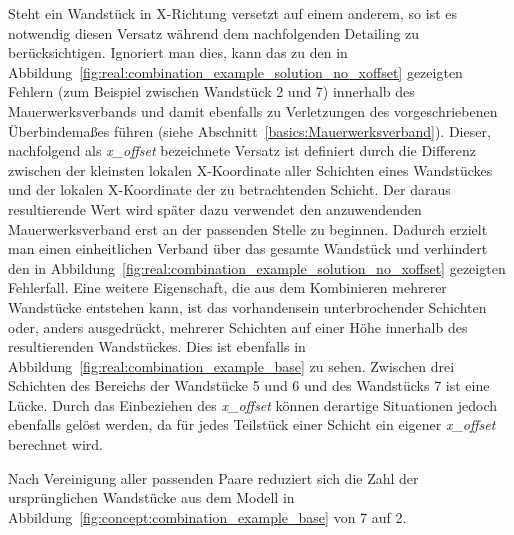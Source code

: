 Steht ein Wandstück in X-Richtung versetzt auf einem anderem, so ist es notwendig diesen Versatz während dem nachfolgenden Detailing zu berücksichtigen.
Ignoriert man dies, kann das zu den in Abbildung~\ref{fig:real:combination_example_solution_no_xoffset} gezeigten Fehlern (zum Beispiel zwischen Wandstück 2 und 7) innerhalb des Mauerwerksverbands und damit ebenfalls zu Verletzungen des vorgeschriebenen Überbindemaßes führen (siehe Abschnitt~\ref*{basics:Mauerwerksverband}).
Dieser, nachfolgend als \textit{x\_offset} bezeichnete Versatz ist definiert durch die Differenz zwischen der kleinsten lokalen X-Koordinate aller Schichten eines Wandstückes und der lokalen X-Koordinate der zu betrachtenden Schicht.
Der daraus resultierende Wert wird später dazu verwendet den anzuwendenden Mauerwerksverband erst an der passenden Stelle zu beginnen.
Dadurch erzielt man einen einheitlichen Verband über das gesamte Wandstück und verhindert den in Abbildung~\ref{fig:real:combination_example_solution_no_xoffset} gezeigten Fehlerfall.
Eine weitere Eigenschaft, die aus dem Kombinieren mehrerer Wandstücke entstehen kann, ist das vorhandensein unterbrochender Schichten oder, anders ausgedrückt, mehrerer Schichten auf einer Höhe innerhalb des resultierenden Wandstückes.
Dies ist ebenfalls in Abbildung~\ref{fig:real:combination_example_base} zu sehen. 
Zwischen drei Schichten des Bereichs der Wandstücke 5 und 6 und des Wandstücks 7 ist eine Lücke.
Durch das Einbeziehen des \textit{x\_offset} können derartige Situationen jedoch ebenfalls gelöst werden, da für jedes Teilstück einer Schicht ein eigener \textit{x\_offset} berechnet wird.

Nach Vereinigung aller passenden Paare reduziert sich die Zahl der ursprünglichen Wandstücke aus dem Modell in Abbildung~\ref{fig:concept:combination_example_base} von 7 auf 2.

